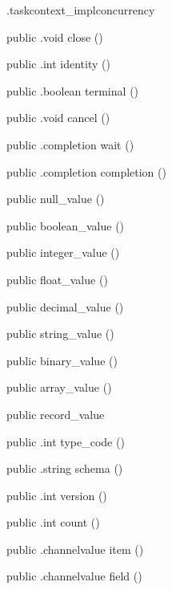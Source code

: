 \begin{CrexxClass}{.taskcontext\_impl}{concurrency}
\begin{Members}
    \Method
      {public}
      {.void}
      {close}
      {()}

    \Method
      {public}
      {.int}
      {identity}
      {()}

    \Method
      {public}
      {.boolean}
      {terminal}
      {()}

    \Method
      {public}
      {.void}
      {cancel}
      {()}

    \Method
      {public}
      {.completion}
      {wait}
      {()}

    \Method
      {public}
      {.completion}
      {completion}
      {()}

    \Factory
      {public}
      {null\_value}
      {()}

    \Factory
      {public}
      {boolean\_value}
      {()}

    \Factory
      {public}
      {integer\_value}
      {()}

    \Factory
      {public}
      {float\_value}
      {()}

    \Factory
      {public}
      {decimal\_value}
      {()}

    \Factory
      {public}
      {string\_value}
      {()}

    \Factory
      {public}
      {binary\_value}
      {()}

    \Factory
      {public}
      {array\_value}
      {()}

    \Factory
      {public}
      {record\_value}
      {}

    \Method
      {public}
      {.int}
      {type\_code}
      {()}

    \Method
      {public}
      {.string}
      {schema}
      {()}

    \Method
      {public}
      {.int}
      {version}
      {()}

    \Method
      {public}
      {.int}
      {count}
      {()}

    \Method
      {public}
      {.channelvalue}
      {item}
      {()}

    \Method
      {public}
      {.channelvalue}
      {field}
      {()}


\end{Members}
\end{CrexxClass}
